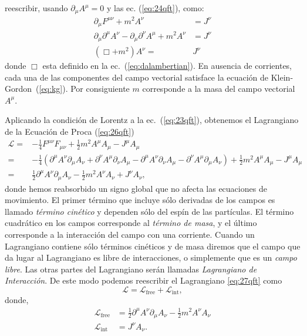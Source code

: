 reescribir, usando $\partial_\mu A^\mu=0$ y las ec. (\ref{eq:24qft}),  como:
\begin{align}
  \label{eq:26qft}
\partial_\mu F^{\mu\nu}+m^2A^\nu&=J^\nu\nonumber\\
\partial_\mu\partial^\mu A^\nu-\partial_\mu\partial^\nu A^\mu+m^2A^\nu&=J^\nu\nonumber\\
   (\Box+m^2)A^\nu=&J^\nu
\end{align}
donde $\Box$ esta definido en la ec.~(\ref{eq:dalambertian}). En ausencia de corrientes, cada una de las componentes del campo
vectorial satisface la ecuación de Klein-Gordon~(\ref{eq:kg}). Por
consiguiente $m$ corresponde a la masa del campo vectorial
$A^\mu$. 

Aplicando la condición de Lorentz a la ec.~(\ref{eq:23qft}), obtenemos el
Lagrangiano de la Ecuación de Proca (\ref{eq:26qft})
\begin{align}
  \label{eq:27qft}
  \mathcal{L}=&-\frac{1}{4}F^{\mu\nu}F_{\mu\nu}+\frac{1}{2}m^2A^\mu A_\mu-J^\mu A_\mu\nonumber\\
=&-\frac{1}{4}(\partial^\mu A^\nu\partial_\mu A_\nu
+\partial^\nu A^\mu\partial_\nu A_\mu-\partial^\mu A^\nu\partial_\nu A_\mu
-\partial^\nu A^\mu\partial_\mu A_\nu)+\frac{1}{2}m^2A^\mu A_\mu-J^\mu A_\mu\nonumber\\
  =&\frac{1}{2}\partial^\mu A^\nu\partial_\mu A_\nu-\frac{1}{2} m^2A^\nu A_\nu+J^\nu A_\nu,
\end{align}
donde hemos reabsorbido un signo global que no afecta las ecuaciones
de movimiento. El primer término que incluye sólo derivadas de los
campos es llamado \emph{término cinético} y dependen sólo del espín de
las partículas. El término cuadrático en
los campos corresponde al \emph{término de masa}, y el último
corresponde a la interacción del campo con una corriente. Cuando un
Lagrangiano contiene sólo términos cinéticos y de masa diremos que el
campo que da lugar al Lagrangiano es libre de interacciones, o
simplemente que es un \emph{campo libre}. Las otras partes del
Lagrangiano serán llamadas \emph{Lagrangiano de Interacción}. De este
modo podemos reescribir el Lagrangiano \eqref{eq:27qft} como
\begin{equation*}
\mathcal{L}=\mathcal{L}_{\text{free}}+\mathcal{L}_{\text{int}},  
\end{equation*}
donde,
\begin{align}
\mathcal{L}_{\text{free}}&=\frac{1}{2}\partial^\mu A^\nu\partial_\mu A_\nu-\frac{1}{2} m^2A^\nu A_\nu\nonumber\\
\label{eq:28qft}
\mathcal{L}_{\text{int}}&=J^\nu A_\nu.
\end{align}

